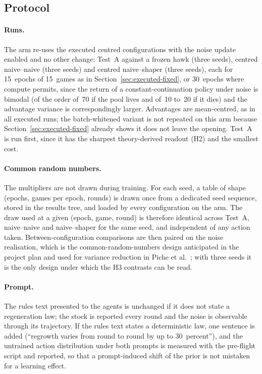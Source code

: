 \subsection{Protocol}

\paragraph{Runs.}
The arm re-uses the executed centred configurations with the noise update
enabled and no other change: Test~A against a frozen hawk
(three seeds), centred naive--naive (three seeds) and centred
naive--shaper (three seeds), each for 15~epochs of 15~games as in
Section~\ref{sec:executed-fixed}, or 30~epochs where compute permits,
since the return of a constant-continuation policy under noise is bimodal
(of the order of~70 if the pool lives and of~10 to~20 if it dies) and the
advantage variance is correspondingly larger.
Advantages are mean-centred, as in all executed runs; the batch-whitened
variant is not repeated on this arm because Section~\ref{sec:executed-fixed}
already shows it does not leave the opening.
Test~A is run first, since it has the sharpest theory-derived readout (H2)
and the smallest cost.

\paragraph{Common random numbers.}
The multipliers are not drawn during training.
For each seed, a table of shape (epochs, games per epoch, rounds) is drawn
once from a dedicated seed sequence, stored in the results tree, and loaded
by every configuration on the arm.
The draw used at a given (epoch, game, round) is therefore identical across
Test~A, naive--naive and naive--shaper for the same seed, and independent of
any action taken.
Between-configuration comparisons are then paired on the noise realisation,
which is the common-random-numbers design anticipated in the project plan
and used for variance reduction in Piche et al.\ \cite{piche2025}; with
three seeds it is the only design under which the H3 contrasts can be read.

\paragraph{Prompt.}
The rules text presented to the agents is unchanged if it does not state a
regeneration law; the stock is reported every round and the noise is
observable through its trajectory.
If the rules text states a deterministic law, one sentence is added
(``regrowth varies from round to round by up to 30~percent''), and the
untrained action distribution under both prompts is measured with the
pre-flight script and reported, so that a prompt-induced shift of the prior
is not mistaken for a learning effect.

